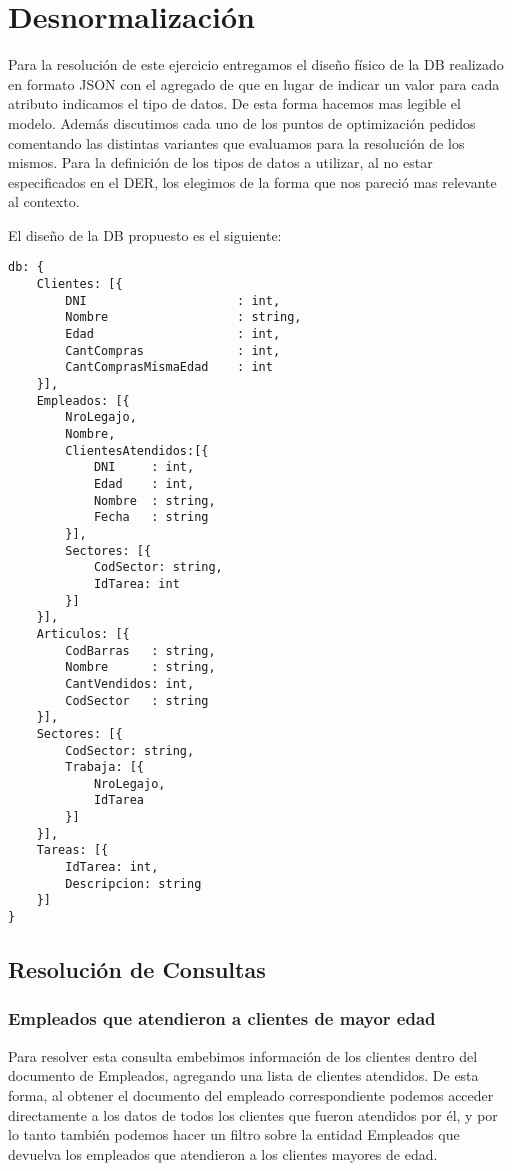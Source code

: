 \section{Desnormalizaci\'on}

Para la resoluci\'on de este ejercicio entregamos el dise\~no f\'isico de la DB realizado en formato JSON con el agregado de que en lugar de indicar un valor para cada atributo indicamos el tipo de datos. De esta forma hacemos mas legible el modelo. Adem\'as discutimos cada uno de los puntos de optimizaci\'on pedidos comentando las distintas variantes que evaluamos para la resoluci\'on de los mismos. Para la definici\'on de los tipos de datos a utilizar, al no estar especificados en el DER, los elegimos de la forma que nos pareci\'o mas relevante al contexto.

El dise\~no de la DB propuesto es el siguiente:
   
\begin{verbatim}
db: {
	Clientes: [{
		DNI						: int,
		Nombre					: string,
		Edad					: int,
		CantCompras				: int,
		CantComprasMismaEdad	: int
	}], 
	Empleados: [{
		NroLegajo,
		Nombre,
		ClientesAtendidos:[{ 
			DNI		: int, 
			Edad	: int,
			Nombre	: string,
			Fecha	: string
		}],
		Sectores: [{
			CodSector: string,
			IdTarea: int
		}]
	}],
	Articulos: [{
		CodBarras	: string,
		Nombre		: string,
		CantVendidos: int,
		CodSector	: string
	}],
	Sectores: [{
		CodSector: string,
		Trabaja: [{
			NroLegajo, 
			IdTarea
		}]
	}],
	Tareas: [{
		IdTarea: int,
		Descripcion: string
	}]
}
\end{verbatim}

\subsection{Resoluci\'on de Consultas}

\subsubsection{Empleados que atendieron a clientes de mayor edad}

Para resolver esta consulta embebimos informaci\'on de los clientes dentro del documento de Empleados, agregando una lista de clientes atendidos. De esta forma, al obtener el documento del empleado correspondiente podemos acceder directamente a los datos de todos los clientes que fueron atendidos por \'el, y por lo tanto tambi\'en podemos hacer un filtro sobre la entidad Empleados que devuelva los empleados que atendieron a los clientes mayores de edad.

